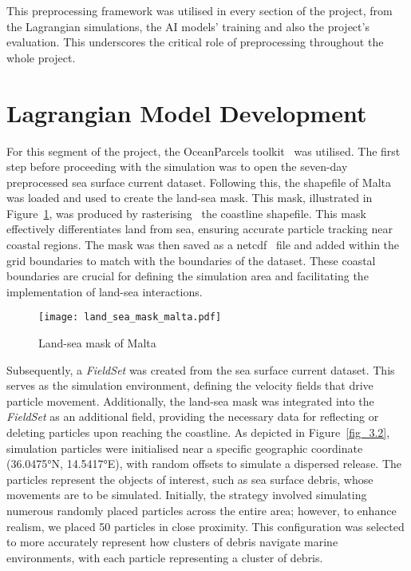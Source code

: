 This preprocessing framework was utilised in every section of the project, from the Lagrangian simulations, the AI models’ training and also the project’s evaluation. This underscores the critical role of preprocessing throughout the whole project. 

\section{Lagrangian Model Development}
\label{sec:3.2}

For this segment of the project, the OceanParcels toolkit~\cite{20} was utilised. The first step before proceeding with the simulation was to open the seven-day preprocessed sea surface current dataset. Following this, the shapefile of Malta was loaded and used to create the land-sea mask. This mask, illustrated in Figure~\ref{fig_3.1}, was produced by rasterising~\cite{47} the coastline shapefile. This mask effectively differentiates land from sea, ensuring accurate particle tracking near coastal regions. The mask was then saved as a \acrshort{netcdf}~\cite{13} file and added within the grid boundaries to match with the boundaries of the dataset. These coastal boundaries are crucial for defining the simulation area and facilitating the implementation of land-sea interactions.

\begin{figure}[htbp]
    \centering
    \texttt{[image: land\_sea\_mask\_malta.pdf]}
    \caption[Short sample caption.]{Land-sea mask of Malta\label{fig_3.1}}
\end{figure}

Subsequently, a \textit{FieldSet} was created from the sea surface current dataset. This serves as the simulation environment, defining the velocity fields that drive particle movement. Additionally, the land-sea mask was integrated into the \textit{FieldSet} as an additional field, providing the necessary data for reflecting or deleting particles upon reaching the coastline. As depicted in Figure~\ref{fig_3.2}, simulation particles were initialised near a specific geographic coordinate (36.0475°N, 14.5417°E), with random offsets to simulate a dispersed release. The particles represent the objects of interest, such as sea surface debris, whose movements are to be simulated. Initially, the strategy involved simulating numerous randomly placed particles across the entire area; however, to enhance realism, we placed 50 particles in close proximity. This configuration was selected to more accurately represent how clusters of debris navigate marine environments, with each particle representing a cluster of debris.

